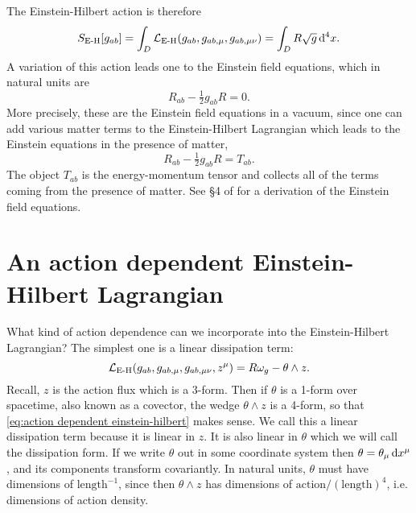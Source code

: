 \documentclass[../main.tex]{subfiles}
\begin{document}
The Einstein-Hilbert action is therefore
\begin{equation} \label{eq:EH action}
	S_{\text{E-H}}[g_{ab}] = \int_D \mathcal{L}_\text{E-H}(g_{ab}, g_{ab,\mu}, g_{ab,\mu\nu}) = \int_D R
	\sqrt{g}\,\mathrm{d}^4x.
\end{equation}
A variation of this action leads one to the Einstein field equations, which in natural
units are
\begin{equation} \label{eq:EFE vacuum}
	R_{ab} - \tfrac{1}{2}g_{ab}R = 0. 
\end{equation}
More precisely, these are the Einstein field equations in a vacuum, since one can add
various matter terms to the Einstein-Hilbert Lagrangian which leads to the Einstein
equations in the presence of matter,
\begin{equation} \label{eq:EFE matter}
	R_{ab} - \tfrac{1}{2}g_{ab}R = T_{ab}. 
\end{equation}
The object \( T_{ab} \) is the energy-momentum tensor and collects all of the terms coming
from the presence of matter. See \S4 of \cite{Carroll1997} for a derivation of the
Einstein field equations. 

\section{An action dependent Einstein-Hilbert Lagrangian}
What kind of action dependence can we incorporate into the Einstein-Hilbert Lagrangian?
The simplest one is a linear dissipation term:
\begin{equation} \label{eq:action dependent einstein-hilbert}
	\mathcal{L}_{\text{E-H}}(g_{ab}, g_{ab,\mu}, g_{ab,\mu\nu}, z^\mu) = R\omega_g - \theta \wedge z. 
\end{equation}
Recall, \( z \) is the action flux which is a 3-form. Then if \( \theta \) is a 1-form
over spacetime, also known as a covector, the wedge \( \theta \wedge z \) is a 4-form, so
that \cref{eq:action dependent einstein-hilbert} makes sense. We call this a linear
dissipation term because it is linear in \( z \). It is also linear in \( \theta \) which
we will call the dissipation form. If we write \( \theta \) out in some coordinate system
then \( \theta = \theta_\mu \,\mathrm{d} x^\mu \), and its components transform covariantly. In
natural units, \( \theta \) must have dimensions of \( \text{length}^{-1} \), since then
\( \theta \wedge z \) has dimensions of \( \text{action}/(\text{length})^4 \), i.e.
dimensions of action density. 
\end{document}
